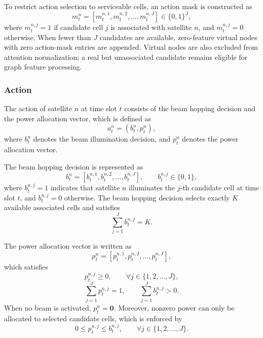 \documentclass[journal]{IEEEtran}
\begin{document}
To restrict action selection to serviceable cells, an action mask is constructed as
\begin{equation}
m_t^n=[m_t^{n,1},m_t^{n,2},\ldots,m_t^{n,J}]\in\{0,1\}^J,
\end{equation}
where $m_t^{n,j}=1$ if candidate cell $j$ is associated with satellite $n$, and $m_t^{n,j}=0$ otherwise. When fewer than $J$ candidates are available, zero-feature virtual nodes with zero action-mask entries are appended. Virtual nodes are also excluded from attention normalization; a real but unassociated candidate remains eligible for graph feature processing.

\subsubsection{Action}

The action of satellite $n$ at time slot $t$ consists of the beam hopping decision and the power allocation vector, which is defined as
\begin{equation}
a_t^n=(b_t^n,p_t^n),
\label{eq:mappo-action}
\end{equation}
where $b_t^n$ denotes the beam illumination decision, and $p_t^n$ denotes the power allocation vector.

The beam hopping decision is represented as
\begin{equation}
b_t^n=[b_t^{n,1},b_t^{n,2},\ldots,b_t^{n,J}],\qquad b_t^{n,j}\in\{0,1\},
\end{equation}
where $b_t^{n,j}=1$ indicates that satellite $n$ illuminates the $j$-th candidate cell at time slot $t$, and $b_t^{n,j}=0$ otherwise. The beam hopping decision selects exactly $K$ available associated cells and satisfies
\begin{equation}
\sum_{j=1}^{J} b_t^{n,j}=K.
\end{equation}

The power allocation vector is written as
\begin{equation}
p_t^n=[p_t^{n,1},p_t^{n,2},\ldots,p_t^{n,J}],
\end{equation}
which satisfies
\begin{equation}
p_t^{n,j}\ge0,\qquad \forall j\in\{1,2,\ldots,J\},
\end{equation}
\begin{equation}
\sum_{j=1}^{J} p_t^{n,j}=1,\qquad \sum_{j=1}^{J}b_t^{n,j}>0.
\end{equation}
When no beam is activated, $p_t^n=\mathbf 0$. Moreover, nonzero power can only be allocated to selected candidate cells, which is enforced by
\begin{equation}
0\le p_t^{n,j}\le b_t^{n,j},\qquad \forall j\in\{1,2,\ldots,J\}.
\end{equation}
\end{document}
